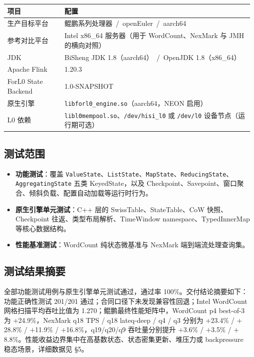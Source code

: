 \documentclass[a4paper,11pt]{article}
\newcommand{\project}{ForL0 State Backend}
\begin{document}
\begin{table}[H]
\centering
\small
\begin{tabularx}{\textwidth}{L{3.2cm} X}
\toprule
\textbf{项目} & \textbf{配置} \\
\midrule
生产目标平台 & 鲲鹏系列处理器 \,/\, openEuler \,/\, aarch64 \\
参考对比平台 & Intel x86\_64 服务器（用于 WordCount、NexMark 与 JMH 的横向对照） \\
JDK & BiSheng JDK 1.8（aarch64） \,/\, OpenJDK 1.8（x86\_64） \\
Apache Flink & 1.20.3 \\
\project{} & 1.0-SNAPSHOT \\
原生引擎 & \texttt{libforl0\_engine.so}（aarch64，NEON 启用） \\
L0 依赖 & \texttt{libl0mempool.so}、\texttt{/dev/hisi\_l0} 或 \texttt{/dev/l0} 设备节点（运行期可选） \\
\bottomrule
\end{tabularx}
\end{table}

\subsection{测试范围}

\begin{itemize}
  \item \textbf{功能测试}：覆盖 \texttt{ValueState}、\texttt{ListState}、\texttt{MapState}、\texttt{ReducingState}、\texttt{AggregatingState} 五类 KeyedState，以及 Checkpoint、Savepoint、窗口聚合、倾斜负载、配置自动加载等运行时行为。
  \item \textbf{原生引擎单元测试}：C++ 层的 SwissTable、StateTable、CoW 快照、Checkpoint 往返、类型布局解析、TimeWindow namespace、TypedInnerMap 等核心数据结构。
  \item \textbf{性能基准测试}：WordCount 纯状态微基准与 NexMark 端到端流处理查询集。
\end{itemize}

\subsection{测试结果摘要}

全部功能测试用例与原生引擎单元测试通过，通过率 100\%。交付结论摘要如下：功能正确性测试 201/201 通过；合同口径下未发现兼容性回退；Intel WordCount 网格扫描平均吞吐比值为 1.270；鲲鹏最终性能矩阵中，WordCount p4 best-of-3 为 $+$24.9\%，NexMark q18 TPS / q18 lateq-deep / q4 / q3 分别为 $+$23.4\% / $+$28.8\% / $+$11.9\% / $+$16.8\%，q19/q20/q9 吞吐量分别提升 $+$3.6\% / $+$3.5\% / $+$8.8\%。性能收益边界集中在高基数状态、状态密集更新、堆压力或 backpressure 稳态场景，详细数据见 \S5。
\end{document}
